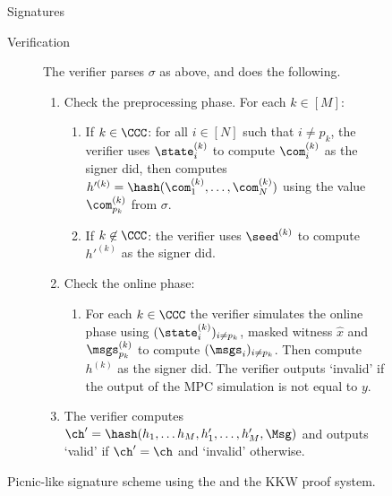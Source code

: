 \begin{figure}[p]
\begin{minipage}[t]{1.1\textwidth}
\begin{protocolbox}{\ttOWF Signatures}
\begin{description}
    \item[Verification] The verifier parses $\sigma$ as above, and does the following.
    \begin{enumerate}
        \item Check the preprocessing phase. For each $k\in[M]$:
        \begin{enumerate}
        \item If $k \in \CCC$: for all $i\in[N]$  such that $i \neq p_k$, the verifier uses $\state^{(k)}_{i}$ to compute $\com^{(k)}_{i}$ as
            the signer did, then computes $h'^{(k)} = \hash(\com^{(k)}_{1},\ldots,\com^{(k)}_{N})$ using
            the value $\com^{(k)}_{p_k}$ from $\sigma$.
        \item If $k\not\in\CCC$: the verifier uses $\seed^{(k)}$ to compute $h'^{(k)}$ as the signer did.
        \end{enumerate}

        \item Check the online phase:
        \begin{enumerate}
            \item For each $k \in \CCC$ the verifier simulates the online phase using $(\state^{(k)}_{i})_{i \neq p_k}$,
                masked witness $\hat{x}$ and $\msgs^{(k)}_{p_k}$ to compute $(\msgs_i)_{i \neq p_k}$.
                Then compute $h^{(k)}$ as the signer did. The verifier outputs `invalid' if the output of the MPC simulation is not equal to $y$.
        \end{enumerate}
    \item The verifier computes $\ch' = \hash(h_1, \ldots h_M, h_1', \ldots, h_M', \Msg)$ and outputs `valid' if $\ch' = \ch$ and `invalid' otherwise.
    \end{enumerate}
 \end{description}
 \end{protocolbox}
 \end{minipage}
	\vspace*{-10pt}
	\caption{\label{fig:23-picnic}Picnic-like signature scheme using the \ttOWF and the KKW proof system.}
\end{figure}


\iffull\else\fi
